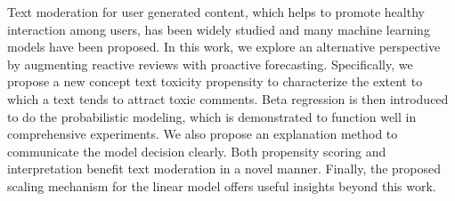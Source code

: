 Text moderation for user generated content, which helps to promote healthy interaction among users, has been widely studied and many machine learning models have been proposed. In this work, we explore an alternative perspective by augmenting reactive reviews with proactive forecasting. Specifically, we propose a new concept text toxicity propensity to characterize the extent to which a text tends to attract toxic comments. Beta regression is then introduced to do the probabilistic modeling, which is demonstrated to function well in comprehensive experiments. We also propose an explanation method to communicate the model decision clearly. Both propensity scoring and interpretation benefit text moderation in a novel manner. Finally, the proposed scaling mechanism for the linear model offers useful insights beyond this work.
